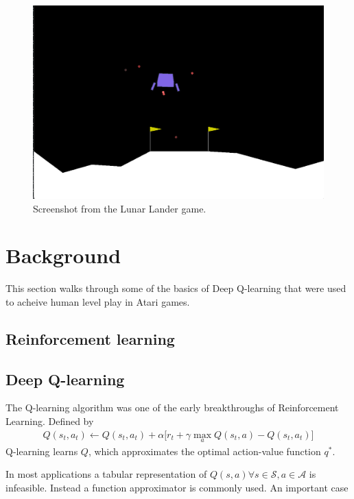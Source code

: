 \documentclass{article}
\begin{document}
\begin{figure}
  \includegraphics[width=\linewidth]{images/screenshot.png}
  \caption{Screenshot from the Lunar Lander game.}
  \label{fig:screenshot}
\end{figure}

\section{Background}
\label{background}
This section walks through some of the basics of Deep Q-learning that were used to acheive human level play in Atari games.

\subsection{Reinforcement learning}

\subsection{Deep Q-learning}
The Q-learning algorithm \cite{watkins} was one of the early breakthroughs of Reinforcement Learning. Defined by
\begin{align}
  \label{eq:Qlearning}
  Q(s_t, a_t) \gets Q(s_t, a_t) + \alpha \Big[ r_t + \gamma \max_a Q(s_t, a) - Q(s_t, a_t)\Big]
\end{align}
Q-learning learns $Q$, which approximates the optimal action-value function $q^*$.

In most applications a tabular representation of $Q(s,a) \forall s \in \mathcal{S}, a \in \mathcal{A}$ is infeasible. Instead a function approximator is commonly used. An important case
\end{document}
